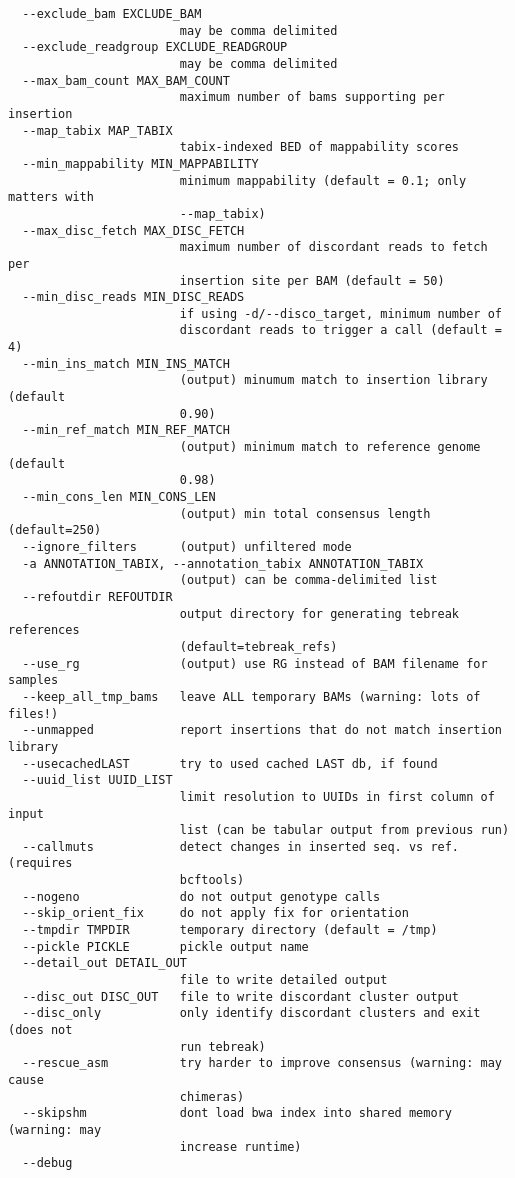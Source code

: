\documentclass[letterpaper,11pt]{article}
\begin{document}
\begin{verbatim}
  --exclude_bam EXCLUDE_BAM
                        may be comma delimited
  --exclude_readgroup EXCLUDE_READGROUP
                        may be comma delimited
  --max_bam_count MAX_BAM_COUNT
                        maximum number of bams supporting per insertion
  --map_tabix MAP_TABIX
                        tabix-indexed BED of mappability scores
  --min_mappability MIN_MAPPABILITY
                        minimum mappability (default = 0.1; only matters with
                        --map_tabix)
  --max_disc_fetch MAX_DISC_FETCH
                        maximum number of discordant reads to fetch per
                        insertion site per BAM (default = 50)
  --min_disc_reads MIN_DISC_READS
                        if using -d/--disco_target, minimum number of
                        discordant reads to trigger a call (default = 4)
  --min_ins_match MIN_INS_MATCH
                        (output) minumum match to insertion library (default
                        0.90)
  --min_ref_match MIN_REF_MATCH
                        (output) minimum match to reference genome (default
                        0.98)
  --min_cons_len MIN_CONS_LEN
                        (output) min total consensus length (default=250)
  --ignore_filters      (output) unfiltered mode
  -a ANNOTATION_TABIX, --annotation_tabix ANNOTATION_TABIX
                        (output) can be comma-delimited list
  --refoutdir REFOUTDIR
                        output directory for generating tebreak references
                        (default=tebreak_refs)
  --use_rg              (output) use RG instead of BAM filename for samples
  --keep_all_tmp_bams   leave ALL temporary BAMs (warning: lots of files!)
  --unmapped            report insertions that do not match insertion library
  --usecachedLAST       try to used cached LAST db, if found
  --uuid_list UUID_LIST
                        limit resolution to UUIDs in first column of input
                        list (can be tabular output from previous run)
  --callmuts            detect changes in inserted seq. vs ref. (requires
                        bcftools)
  --nogeno              do not output genotype calls
  --skip_orient_fix     do not apply fix for orientation
  --tmpdir TMPDIR       temporary directory (default = /tmp)
  --pickle PICKLE       pickle output name
  --detail_out DETAIL_OUT
                        file to write detailed output
  --disc_out DISC_OUT   file to write discordant cluster output
  --disc_only           only identify discordant clusters and exit (does not
                        run tebreak)
  --rescue_asm          try harder to improve consensus (warning: may cause
                        chimeras)
  --skipshm             dont load bwa index into shared memory (warning: may
                        increase runtime)
  --debug
\end{verbatim}
\end{document}
